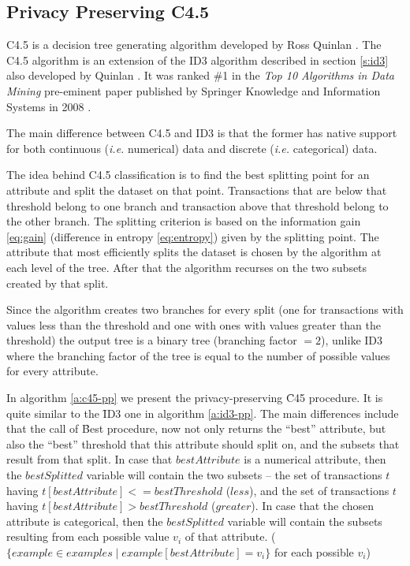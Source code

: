 \subsection{Privacy Preserving C4.5}\label{s:pp-c45}
C4.5 is a decision tree generating algorithm developed by Ross Quinlan \cite{quinlan1993c4}.
The C4.5 algorithm is an extension of the ID3 algorithm described in section \ref{s:id3} also developed by Quinlan \cite{quinlan1986induction}.
It was ranked \#1 in the \textit{Top 10 Algorithms in Data Mining} pre\hyp eminent paper published by Springer Knowledge and Information Systems in 2008 \cite{wu2008top}.

The main difference between C4.5 and ID3 is that the former has native support for both continuous (\textit{i.e.} numerical) data and discrete (\textit{i.e.} categorical) data.

The idea behind C4.5 classification is to find the best splitting point for an attribute and split the dataset on that point.
Transactions that are below that threshold belong to one branch and transaction above that threshold belong to the other branch.
The splitting criterion is based on the information gain \ref{eq:gain} (difference in entropy \ref{eq:entropy}) given by the splitting point.
The attribute that most efficiently splits the dataset is chosen by the algorithm at each level of the tree.
After that the algorithm recurses on the two subsets created by that split.

Since the algorithm creates two branches for every split (one for transactions with values less than the threshold and one with ones with values greater than the threshold) the output tree is a binary tree (branching factor $= 2$), unlike ID3 where the branching factor of the tree is equal to the number of possible values for every attribute.

In algorithm \ref{a:c45-pp} we present the privacy\hyp preserving \f{C45} procedure.
It is quite similar to the \f{ID3} one in algorithm \ref{a:id3-pp}.
The main differences include that the call of \f{Best} procedure, now not only returns the ``best'' attribute, but also the ``best'' threshold that this attribute should split on, and the subsets that result from that split.
In case that $bestAttribute$ is a numerical attribute, then the $bestSplitted$ variable will contain the two subsets -- the set of transactions $t$ having $t[bestAttribute] <= bestThreshold$ ($less$), and the set of transactions $t$ having $t[bestAttribute] > bestThreshold$ ($greater$).
In case that the chosen attribute is categorical, then the $bestSplitted$ variable will contain the subsets resulting from each possible value $v_i$ of that attribute. ($\{example \in examples \mid example[bestAttribute] = v_i\}$ for each possible $v_i$)

